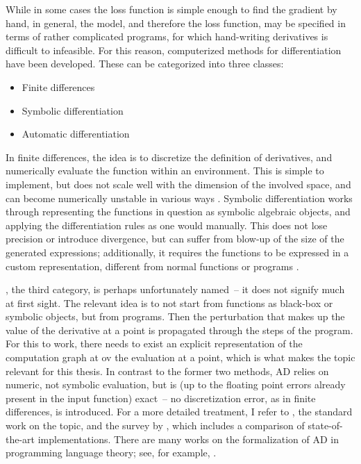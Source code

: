While in some cases the loss function is simple enough to find the gradient by hand, in general, the
model, and therefore the loss function, may be specified in terms of rather complicated programs,
for which hand-writing derivatives is difficult to infeasible.  For this reason, computerized
methods for differentiation have been developed.  These can be categorized into three classes:
\begin{itemize}
  \firmlist
\item Finite differences
\item Symbolic differentiation
\item Automatic differentiation
\end{itemize}
In finite differences, the idea is to discretize the definition of derivatives, and numerically
evaluate the function within an environment.  This is simple to implement, but does not scale well
with the dimension of the involved space, and can become numerically unstable in various ways
\parencite[section 5.7]{press2007numerical}.  Symbolic differentiation works through representing
the functions in question as symbolic algebraic objects, and applying the differentiation rules as
one would manually.  This does not lose precision or introduce divergence, but can suffer from
blow-up of the size of the generated expressions; additionally, it requires the functions to be
expressed in a custom representation, different from normal functions or programs
\parencite{baydin2018automatic}.

, the third category, is perhaps unfortunately named~-- it
does not signify much at first sight.  The relevant idea is to not start from functions as black-box
or symbolic objects, but from programs.  Then the perturbation that makes up the value of the
derivative at a point is propagated through the steps of the program.  For this to work, there needs
to exist an explicit representation of the computation graph at ov the evaluation at a point, which
is what makes the topic relevant for this thesis.  In contrast to the former two methods, AD relies
on numeric, not symbolic evaluation, but is (up to the floating point errors already present in the
input function) exact~-- no discretization error, as in finite differences, is introduced.  For a
more detailed treatment, I refer to \textcite{griewank2008evaluating}, the standard work on the
topic, and the survey by \textcite{baydin2018automatic}, which includes a comparison of
state-of-the-art implementations.  There are many works on the formalization of AD in programming
language theory; see, for example, \textcite{abadi2020simple}.

